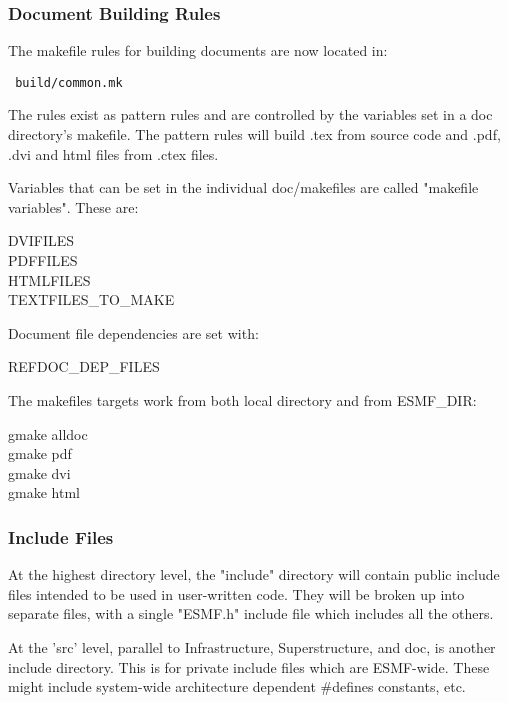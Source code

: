\subsubsection{Document Building Rules} 
The makefile rules for building documents are now located in:
\begin{verbatim} build/common.mk \end{verbatim} 
The rules exist
as pattern rules and are controlled by the variables set in a doc
directory's makefile.  The pattern rules will build .tex  from source code
and .pdf, .dvi and html files from .ctex files.

Variables that can be set in the individual doc/makefiles are called
"makefile variables".  These are: 
\begin{description} 
\item [DVIFILES]
\item [PDFFILES] 
\item [HTMLFILES] 
\item [TEXTFILES\_TO\_MAKE]
\end{description}

Document file dependencies are set with: 
\begin{description} 
\item [REFDOC\_DEP\_FILES]
\end{description}

The makefiles targets work from both local directory and from ESMF\_DIR:
\begin{description} 
\item [gmake alldoc] 
\item [gmake pdf] 
\item [gmake dvi] 
\item [gmake html] 
\end{description}


\subsubsection{Include Files} 
At the highest directory level, the "include"
directory will contain public include files intended to be used in
user-written code.  They will be broken up into separate files, with a
single "ESMF.h" include file which includes all the others.

At the 'src' level, parallel to Infrastructure, Superstructure, and doc,
is another include directory.  This is for private include files which are
ESMF-wide.  These might include system-wide architecture dependent
\#defines constants, etc.

